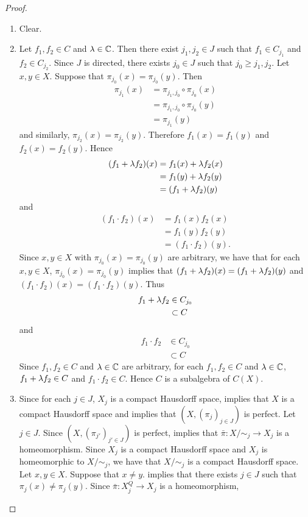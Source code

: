 \documentclass{book}
\begin{document}
\begin{proof}\
	\begin{enumerate}
		\item Clear.
		\item Let $f_1 , f_2 \in C$ and $\lambda \in \mathbb{C}$. Then there exist $j_1, j_2 \in J$ such that $f_1 \in C_{j_1}$ and $f_2 \in C_{j_2}$. Since $J$ is directed, there exists $j_0 \in J$ such that $j_0 \geq j_1, j_2$. Let $x,y \in X$. Suppose that $\pi_{j_0}(x) = \pi_{j_0}(y)$. Then 
		\begin{align*}
			\pi_{j_1}(x)
			& = \pi_{j_1, j_0} \circ \pi_{j_0}(x) \\
			& =  \pi_{j_1, j_0} \circ \pi_{j_0}(y) \\
			& = \pi_{j_1}(y)
		\end{align*}
		and similarly, $\pi_{j_2}(x) = \pi_{j_2}(y)$. Therefore $f_1(x) = f_1(y)$ and $f_{2}(x) = f_2(y)$. Hence 
		\begin{align*}
			(f_1 + \lambda f_2)(x)
			& = f_1(x) + \lambda f_2(x) \\
			& = f_1(y) + \lambda f_2(y) \\
			& = (f_1 + \lambda f_2)(y)
		\end{align*}
		and 
		\begin{align*}
			(f_1 \cdot f_2)(x)
			& = f_1(x)f_2(x) \\
			& = f_1(y)f_2(y) \\
			& = (f_1 \cdot f_2) (y).
		\end{align*}
		Since $x, y \in X$ with $\pi_{j_0}(x) = \pi_{j_0}(y)$ are arbitrary, we have that for each $x,y \in X$, $\pi_{j_0}(x) = \pi_{j_0}(y)$ implies that $(f_1 + \lambda f_2)(x) = (f_1 + \lambda f_2)(y)$ and $(f_1 \cdot f_2)(x) = (f_1 \cdot f_2)(y)$. Thus 
		\begin{align*}
			f_1 + \lambda f_2 
			& \in C_{j_0} \\
			& \subset C
		\end{align*} 
		and 
		\begin{align*}
			f_1 \cdot f_2
			& \in C_{j_0} \\
			& \subset C
		\end{align*} 
		Since $f_1 , f_2 \in C$ and $\lambda \in \mathbb{C}$ are arbitrary, for each $f_1 , f_2 \in C$ and $\lambda \in \mathbb{C}$, $f_1 + \lambda f_2 \in C$ and $f_1 \cdot f_2 \in C$. Hence $C$ is a subalgebra of $C(X)$. 
		\item Since for each $j \in J$, $X_j$ is a compact Hausdorff space, \rex{ex:topology:proj_limits:0006} implies that $X$ is a compact Hausdorff space and  implies that $(X, (\pi_j)_{j \in J})$ is perfect. Let $j \in J$. Since $(X, (\pi_{j'})_{j' \in J})$ is perfect,  implies that $\bar{\pi}:X/{\sim_j} \rightarrow X_j$ is a homeomorphism. Since $X_j$ is a compact Hausdorff space and $X_j$ is homeomorphic to $X/{\sim_j}$, we have that $X/{\sim_j}$ is a compact Hausdorff space.  Let $x,y \in X$. Suppose that $x \neq y$.   implies that there exists $j \in J$ such that $\pi_j(x) \neq \pi_j(y)$. Since $\bar{\pi}:X^Q_j \rightarrow X_j$ is a homeomorphism, 

\end{enumerate}
\end{proof}
\end{document}
